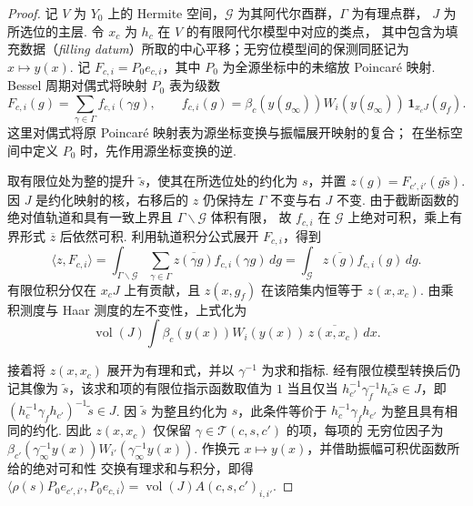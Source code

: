 \begin{proof}
记 $V$ 为 $Y_0$ 上的 Hermite 空间，$\mathcal G$ 为其阿代尔酉群，$\Gamma$ 为有理点群，
$J$ 为所选位的主层. 令 $x_c$ 为 $h_c$ 在 $V$ 的有限阿代尔模型中对应的类点，
其中包含为填充数据（\emph{filling datum}）所取的中心平移；无穷位模型间的保测同胚记为
$x\mapsto y(x)$. 记 $F_{c,i}=P_0e_{c,i}$，其中 $P_0$ 为全源坐标中的未缩放 Poincaré 映射.
Bessel 周期对偶式将映射 $P_0$ 表为级数
\[
 F_{c,i}(g)=\sum_{\gamma\in\Gamma} f_{c,i}(\gamma g),\qquad
 f_{c,i}(g)
 =\beta_c(y(g_\infty))W_i(y(g_\infty))\,
       \mathbf 1_{x_cJ}(g_f).
\]
这里对偶式将原 Poincaré 映射表为源坐标变换与振幅展开映射的复合；
在坐标空间中定义 $P_0$ 时，先作用源坐标变换的逆.

取有限位处为整的提升 $\widetilde s$，使其在所选位处的约化为 $s$，并置 $z(g)=F_{c',i'}(g\widetilde s)$.
因 $J$ 是约化映射的核，右移后的 $z$ 仍保持左 $\Gamma$ 不变与右 $J$ 不变.
由于截断函数的绝对值轨道和具有一致上界且 $\Gamma\backslash\mathcal G$ 体积有限，
故 $f_{c,i}$ 在 $\mathcal G$ 上绝对可积，乘上有界形式 $\overline z$ 后依然可积.
利用轨道积分公式展开 $F_{c,i}$，得到
\[
 \langle z,F_{c,i}\rangle
 =\int_{\Gamma\backslash\mathcal G}
     \sum_{\gamma\in\Gamma}\overline{z(\gamma g)}f_{c,i}(\gamma g)\,dg
 =\int_{\mathcal G}\overline{z(g)}f_{c,i}(g)\,dg .
\]
有限位积分仅在 $x_cJ$ 上有贡献，且 $z(x,g_f)$ 在该陪集内恒等于
$z(x,x_c)$. 由乘积测度与 Haar 测度的左不变性，上式化为
\[
 \operatorname{vol}(J)\int
    \beta_c(y(x))W_i(y(x))\,\overline{z(x,x_c)}\,dx.
\]

接着将 $z(x,x_c)$ 展开为有理和式，并以 $\gamma^{-1}$ 为求和指标.
经有限位模型转换后仍记其像为 $\widetilde s$，该求和项的有限位指示函数取值为 $1$ 当且仅当
$h_{c'}^{-1}\gamma_f^{-1}h_c\widetilde s\in J$，即 $(h_c^{-1}\gamma_f h_{c'})^{-1}\widetilde s\in J$.
因 $\widetilde s$ 为整且约化为 $s$，此条件等价于
$h_c^{-1}\gamma_f h_{c'}$ 为整且具有相同的约化.
因此 $z(x,x_c)$ 仅保留 $\gamma\in\mathcal T(c,s,c')$ 的项，每项的
无穷位因子为 $\beta_{c'}(\gamma_\infty^{-1}y(x))
W_{i'}(\gamma_\infty^{-1}y(x))$.
作换元 $x\mapsto y(x)$，并借助振幅可积优函数所给的绝对可和性
交换有理求和与积分，即得
$\langle \rho(s)P_0e_{c',i'},P_0e_{c,i}\rangle=\operatorname{vol}(J)A(c,s,c')_{i,i'}$.


\end{proof}
